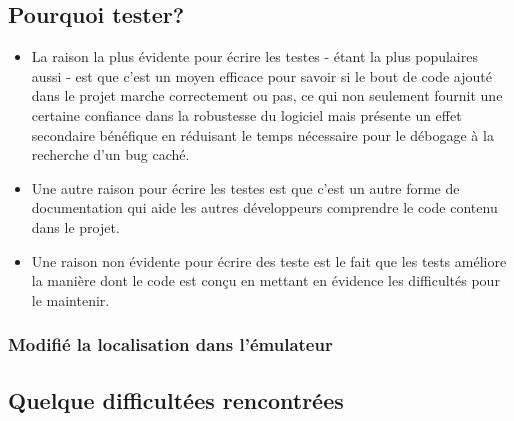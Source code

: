 \subsection[Pourquoi tester?]{Pourquoi tester? ~\cite{pycon:getting_started_with_automated_testing}}

\begin{itemize}
\item La raison la plus évidente pour écrire les testes - étant la plus populaires aussi - est que c'est un moyen efficace pour savoir si le bout de code ajouté dans le projet marche correctement ou pas, ce qui non seulement fournit une certaine confiance dans la robustesse du logiciel mais présente un effet secondaire bénéfique en réduisant le temps nécessaire pour le débogage à la recherche d'un bug caché. %
\item Une autre raison pour écrire les testes est que c'est un autre forme de documentation qui aide les autres développeurs comprendre le code contenu dans le projet.
\item Une raison non évidente pour écrire des teste est le fait que les tests améliore la manière dont le code est conçu en mettant en évidence les difficultés pour le maintenir.
\end{itemize}
\subsubsection{Modifié la localisation dans l'émulateur}%

\subsection{Quelque difficultées rencontrées}